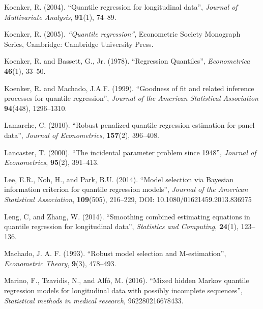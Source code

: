 \documentclass[12pt]{article}
\begin{document}
\begin{thebibliography}{7}
Koenker, R. (2004).
\newblock ``Quantile regression for longitudinal data'',
\newblock \textit{Journal of Multivariate Analysis}, \textbf{91}(1), 74--89.

Koenker, R. (2005).
\newblock \textit{``Quantile regression''},
\newblock Econometric Society Monograph Series, Cambridge: Cambridge University Press.

Koenker, R. and Bassett, G., Jr. (1978).
\newblock ``Regression Quantiles'',
\newblock \textit{Econometrica} \textbf{46}(1), 33--50.

Koenker, R. and Machado, J.A.F. (1999).
\newblock ``Goodness of fit and related inference processes for quantile regression'',
\newblock \textit{Journal of the American Statistical Association} \textbf{94}(448), 1296--1310.



Lamarche, C. (2010).
\newblock ``Robust penalized quantile regression estimation for panel data'',
\newblock \textit{Journal of Econometrics}, \textbf{157}(2), 396--408.

Lancaster, T. (2000).
\newblock ``The incidental parameter problem since 1948'',
\newblock \textit{Journal of Econometrics}, \textbf{95}(2), 391--413.

Lee, E.R., Noh, H., and Park, B.U. (2014).
\newblock ``Model selection via Bayesian information criterion for quantile regression models'',
\newblock \textit{Journal of the American Statistical Association}, \textbf{109}(505), 216--229, DOI: 10.1080/01621459.2013.836975


Leng, C, and Zhang, W. (2014).
\newblock ``Smoothing combined estimating equations in quantile regression for longitudinal data'',
\newblock \textit{Statistics and Computing}, \textbf{24}(1), 123--136.


Machado, J. A. F. (1993).
\newblock ``Robust model selection and M-estimation'',
\newblock \textit{Econometric Theory}, \textbf{9}(3), 478--493.


Marino, F., Tzavidis, N., and Alf\'o, M. (2016).
\newblock ``Mixed hidden Markov quantile regression models for longitudinal data with possibly incomplete sequences'',
\newblock \textit{Statistical methods in medical research}, 962280216678433.




\end{thebibliography}
\end{document}
